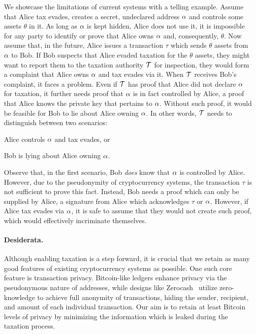 We showcase the limitations of current systems with a telling example.  Assume
that Alice tax evades, \ie creates a secret, undeclared address $\alpha$ and
controls some assets $\theta$ in it. As long as $\alpha$ is kept hidden, \ie
Alice does not use it, it is impossible for any party to identify or prove that
Alice owns $\alpha$ and, consequently, $\theta$.
Now assume that, in the future, Alice issues a transaction $\tau$ which
sends $\theta$ assets from $\alpha$ to Bob. If Bob suspects that Alice evaded
taxation for the $\theta$ assets, they might want to report them to the
taxation authority $\mathcal{T}$ for inspection, \ie they would form a complaint
that Alice owns $\alpha$ and tax evades via it.
When $\mathcal{T}$ receives Bob's complaint, it faces a problem. Even if
$\mathcal{T}$ has proof that Alice did not declare $\alpha$ for taxation, it
further needs proof that $\alpha$ is in fact controlled by Alice, \ie a proof
that Alice knows the private key that pertains to $\alpha$. Without such
proof, it would be feasible for Bob to lie about Alice owning $\alpha$. In
other words, $\mathcal{T}$ needs to distinguish between two scenarios:
\begin{inparaenum}[i)]
    \item Alice controls $\alpha$ and tax evades, or
    \item Bob is lying about Alice owning $\alpha$.
\end{inparaenum}
Observe that, in the first scenario, Bob \emph{does} know that $\alpha$ is
controlled by Alice. However, due to the pseudonymity of cryptocurrency
systems, the transaction $\tau$ is not sufficient to prove this fact. Instead,
Bob needs a proof which can only be supplied by Alice, \eg a signature from
Alice which acknowledges $\tau$ or $\alpha$. However, if Alice tax evades via
$\alpha$, it is safe to assume that they would not create such proof, which
would effectively incriminate themselves.

\paragraph{Desiderata.}\label{subsec:desiderata}

Although enabling taxation is a step forward, it is crucial that we retain as
many good features of existing cryptocurrency systems as possible. One such
core feature is transaction privacy. Bitcoin-like ledgers enhance privacy via
the pseudonymous nature of addresses, while designs like
Zerocash~\cite{SP:BCGGMT14} utilize zero-knowledge to achieve full anonymity of
transactions, \ie hiding the sender, recipient, and amount of each individual
transaction. Our aim is to retain at least Bitcoin levels of privacy by
minimizing the information which is leaked during the taxation process.

